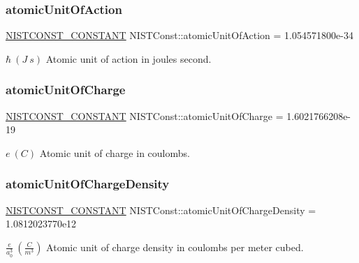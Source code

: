 \subsubsection{\texorpdfstring{atomic\+Unit\+Of\+Action}{atomicUnitOfAction}}
{\footnotesize\ttfamily \mbox{\hyperlink{_n_i_s_t_const_8hpp_a2b0fc1d7452373f816175dd86ce26729}{N\+I\+S\+T\+C\+O\+N\+S\+T\+\_\+\+C\+O\+N\+S\+T\+A\+NT}} N\+I\+S\+T\+Const\+::atomic\+Unit\+Of\+Action = 1.\+054571800e-\/34}

$\hbar \ (J\ s)$ Atomic unit of action in joules second. \mbox{\label{group___n_i_s_t_const-_atomic_unit_gaa850ac93fa2ec31582147af4bcafd984}} 
\subsubsection{\texorpdfstring{atomic\+Unit\+Of\+Charge}{atomicUnitOfCharge}}
{\footnotesize\ttfamily \mbox{\hyperlink{_n_i_s_t_const_8hpp_a2b0fc1d7452373f816175dd86ce26729}{N\+I\+S\+T\+C\+O\+N\+S\+T\+\_\+\+C\+O\+N\+S\+T\+A\+NT}} N\+I\+S\+T\+Const\+::atomic\+Unit\+Of\+Charge = 1.\+6021766208e-\/19}

$e \ (C)$ Atomic unit of charge in coulombs. \mbox{\label{group___n_i_s_t_const-_atomic_unit_gaaeb55a2b43e7885495495e2a613eb481}} 
\subsubsection{\texorpdfstring{atomic\+Unit\+Of\+Charge\+Density}{atomicUnitOfChargeDensity}}
{\footnotesize\ttfamily \mbox{\hyperlink{_n_i_s_t_const_8hpp_a2b0fc1d7452373f816175dd86ce26729}{N\+I\+S\+T\+C\+O\+N\+S\+T\+\_\+\+C\+O\+N\+S\+T\+A\+NT}} N\+I\+S\+T\+Const\+::atomic\+Unit\+Of\+Charge\+Density = 1.\+0812023770e12}

$\frac{e}{a_0^3} \ (\frac{C}{m^3})$ Atomic unit of charge density in coulombs per meter cubed. \mbox{\label{group___n_i_s_t_const-_atomic_unit_ga664164b535c0f978a02afff805d58a34}} 
